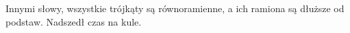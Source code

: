 Innymi słowy, wszystkie trójkąty są równoramienne, a ich ramiona są dłuższe od podstaw.
Nadszedł czas na kule.

\begin{Figure}
 \centering
\end{Figure}


